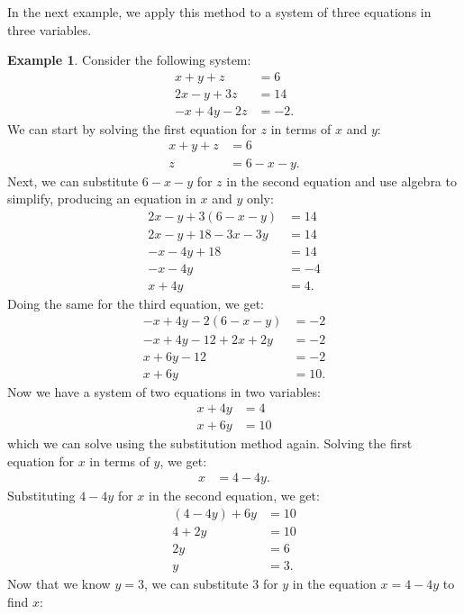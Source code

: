 \documentclass{article}
\theoremstyle{definition}
\newtheorem{example}{Example}
\begin{document}
In the next example, we apply this method to a system of three equations in three variables.

\begin{example}\label{ex:substitution-method-2}
Consider the following system:
\begin{align*}
    x+y+z&=6 \\
    2x-y+3z&=14 \\
    -x+4y-2z&=-2.
\end{align*}
We can start by solving the first equation for \(z\) in terms of \(x\) and \(y\):
\begin{align*}
    x+y+z&=6 \\
    z&=6-x-y.
\end{align*}
Next, we can substitute \(6-x-y\) for \(z\) in the second equation and use algebra to simplify, producing an equation in \(x\) and \(y\) only:
\begin{align*}
    2x-y+3(6-x-y)&=14 \\
    2x-y+18-3x-3y&=14 \\
    -x-4y+18&=14 \\
    -x-4y&=-4 \\
    x+4y&=4.
\end{align*}
Doing the same for the third equation, we get:
\begin{align*}
    -x+4y-2(6-x-y)&=-2 \\
    -x+4y-12+2x+2y&=-2 \\
    x+6y-12&=-2 \\
    x+6y&=10.
\end{align*}
Now we have a system of two equations in two variables:
\begin{align*}
    x+4y&=4 \\
    x+6y&=10
\end{align*}
which we can solve using the substitution method again. Solving the first equation for \(x\) in terms of \(y\), we get:
\begin{align*}
    x&=4-4y.
\end{align*}
Substituting \(4-4y\) for \(x\) in the second equation, we get:
\begin{align*}
    (4-4y)+6y&=10 \\
    4+2y&=10 \\
    2y&=6 \\
    y&=3.
\end{align*}
Now that we know \(y=3\), we can substitute \(3\) for \(y\) in the equation \(x=4-4y\) to find \(x\):
\begin{align*}

\end{align*}
\end{example}
\end{document}
